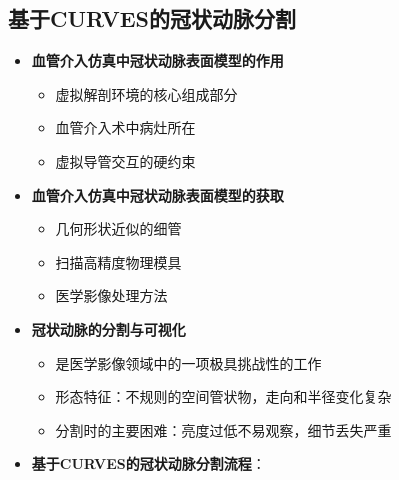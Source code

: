 \subsection[冠状动脉分割I]{基于CURVES的冠状动脉分割}

\begin{frame}
\begin{itemize}
\item \textbf{血管介入仿真中冠状动脉表面模型的作用}
\begin{itemize}
\item 虚拟解剖环境的核心组成部分
\item 血管介入术中病灶所在
\item 虚拟导管交互的硬约束
\end{itemize}
\pause \item \textbf{血管介入仿真中冠状动脉表面模型的获取}
\begin{itemize}
\item 几何形状近似的细管
\item 扫描高精度物理模具
\item 医学影像处理方法
\end{itemize}
\pause \item \textbf{冠状动脉的分割与可视化}
\begin{itemize}
\item 是医学影像领域中的一项极具挑战性的工作
\item 形态特征：不规则的空间管状物，走向和半径变化复杂
\item 分割时的主要困难：亮度过低不易观察，细节丢失严重
\end{itemize}
\end{itemize}
\end{frame}

\begin{frame}
\begin{itemize}
  \item \textbf{基于CURVES的冠状动脉分割流程}：
\end{itemize}
\begin{figure}[t]
\centering

\end{figure}
\end{frame}

